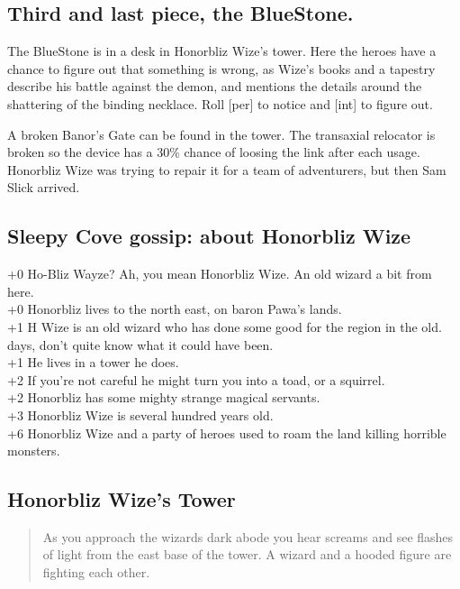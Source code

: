 \documentclass[11pt, twoside, titlepage, a4paper]{report}
\newenvironment{readoutloud}%
{\begin{quote}\begin{itshape}}%
{\end{itshape}\end{quote}}%
\begin{document}
\subsection*{Third and last piece, the BlueStone.}
The BlueStone is in a desk in Honorbliz Wize's tower.
Here the heroes have a chance to figure out that something is wrong, as Wize's books and a tapestry describe his battle against the demon, and mentions the details around the shattering of the binding necklace.
Roll [per] to notice and [int] to figure out.

A broken Banor's Gate can be found in the tower. The transaxial relocator is broken so the device has a 30\% chance of loosing the link after each usage. Honorbliz Wize was trying to repair it for a team of adventurers, but then Sam Slick arrived.


\subsection*{Sleepy Cove gossip: about Honorbliz Wize}
+0 Ho-Bliz Wayze? Ah, you mean Honorbliz Wize. An old wizard a bit from here. \\
+0 Honorbliz lives to the north east, on baron Pawa's lands. \\
+1 H Wize is an old wizard who has done some good for the region in the old. \\ days, don't quite know what it could have been. \\
+1 He lives in a tower he does. \\
+2 If you're not careful he might turn you into a toad, or a squirrel. \\
+2 Honorbliz has some mighty strange magical servants. \\
+3 Honorbliz Wize is several hundred years old. \\
+6 Honorbliz Wize and a party of heroes used to roam the land killing horrible monsters. \\


\subsection*{Honorbliz Wize's Tower}
\begin{readoutloud}
As you approach the wizards dark abode you hear screams and see flashes of light from the east base of the tower. A wizard and a hooded figure are fighting each other.
\end{readoutloud}
\end{document}
